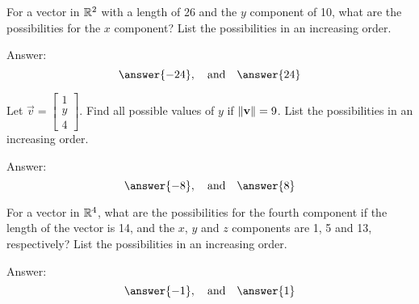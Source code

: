 \documentclass{ximera}
\begin{document}
\begin{problem}\label{prob:comppossibilities}
For a vector in $\mathbb{R}^2$ with a length of 26 and the $y$ component of 10, what are the possibilities for the $x$ component?  List the possibilities in an increasing order.

Answer:
$$\answer{-24},\quad\text{and}\quad\answer{24} $$
\end{problem}

\begin{problem}\label{prob:yvaluesgivennorm}
Let $\vec{v}=\begin{bmatrix}1\\ y\\ 4\end{bmatrix}$.  Find all possible values of $y$ if $\left\lVert\mathbf{v}\right\rVert=9$.  List the possibilities in an increasing order.

Answer:
$$\answer{-8},\quad\text{and}\quad\answer{8}$$
\end{problem}

\begin{problem}\label{prob:comppossibilitiesinr4}
For a vector in $\mathbb{R}^4$, what are the possibilities for the fourth component if the length of the vector is 14, and the $x$, $y$ and $z$ components are 1, 5 and 13, respectively? List the possibilities in an increasing order.

Answer:
$$\answer{-1},\quad\text{and}\quad\answer{1}$$
\end{problem}
 
 
\end{document}
